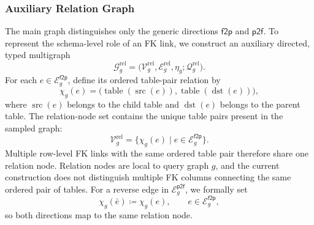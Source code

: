 \documentclass[11pt]{article}
\newcommand{\rel}{\mathrm{rel}}
\DeclareMathOperator{\src}{src}
\DeclareMathOperator{\dst}{dst}
\DeclareMathOperator{\table}{table}
\begin{document}
\subsubsection{Auxiliary Relation Graph}
\label{sec:relation-graph-construction}

The main graph distinguishes only the generic directions
\(\mathsf{f2p}\) and \(\mathsf{p2f}\).  To represent the schema-level role
of an FK link, we construct an auxiliary directed, typed multigraph
\begin{equation}
    \mathcal G_g^{\rel}
    =
    \bigl(
        \mathcal V_g^{\rel},
        \mathcal E_g^{\rel},
        \eta_g;
        \mathcal Q_g^{\rel}
    \bigr).
    \label{eq:relation-graph}
\end{equation}
For each \(e\in\mathcal E_g^{\mathsf{f2p}}\), define its ordered
table-pair relation by
\begin{equation}
    \chi_g(e)
    =
    \bigl(\table(\src(e)),\table(\dst(e))\bigr),
    \label{eq:fk-to-relation}
\end{equation}
where \(\src(e)\) belongs to the child table and \(\dst(e)\) belongs to the
parent table.  The relation-node set contains the unique table pairs present in
the sampled graph:
\begin{equation}
    \mathcal V_g^{\rel}
    =
    \bigl\{
        \chi_g(e)
        \;\big|\;
        e\in\mathcal E_g^{\mathsf{f2p}}
    \bigr\}.
    \label{eq:relation-node-set}
\end{equation}
Multiple row-level FK links with the same ordered table pair therefore share
one relation node.  Relation nodes are local to query graph \(g\), and the
current construction does not distinguish multiple FK columns connecting
the same ordered pair of tables.  For a reverse edge in
\(\mathcal E_g^{\mathsf{p2f}}\), we formally set
\begin{equation}
    \chi_g(\bar e)
    \coloneqq
    \chi_g(e),
    \qquad
    e\in\mathcal E_g^{\mathsf{f2p}},
    \label{eq:reverse-fk-relation}
\end{equation}
so both directions map to the same relation node.
\end{document}
